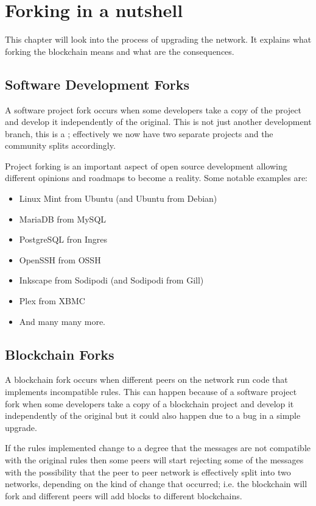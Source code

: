 \chapter{Forking in a nutshell}
\label{ch:forking}

\begin{summary}
This chapter will look into the process of upgrading the network. It explains what forking the blockchain means and what are the consequences.
\end{summary}

\section{Software Development Forks}
A software project fork occurs when some developers take a copy of the project and develop it independently of the original. This is not just another development branch, this is a ; effectively we now have two separate projects and the community splits accordingly.

Project forking is an important aspect of open source development allowing different opinions and roadmaps to become a reality. Some notable examples are:

\begin{itemize}
\item Linux Mint from Ubuntu (and Ubuntu from Debian)
\item MariaDB from MySQL
\item PostgreSQL fron Ingres
\item OpenSSH from OSSH
\item Inkscape from Sodipodi (and Sodipodi from Gill)
\item Plex from XBMC
\item And many many more.
\end{itemize}

\section{Blockchain Forks}
A blockchain fork occurs when different peers on the network run code that implements incompatible rules. This can happen because of a software project fork when some developers take a copy of a blockchain project and develop it independently of the original but it could also happen due to a bug in a simple upgrade.

If the rules implemented change to a degree that the messages are not compatible with the original rules then some peers will start rejecting some of the messages with the possibility that the peer to peer network is effectively split into two networks, depending on the kind of change that occurred; i.e. the blockchain will fork and different peers will add blocks to different blockchains.

